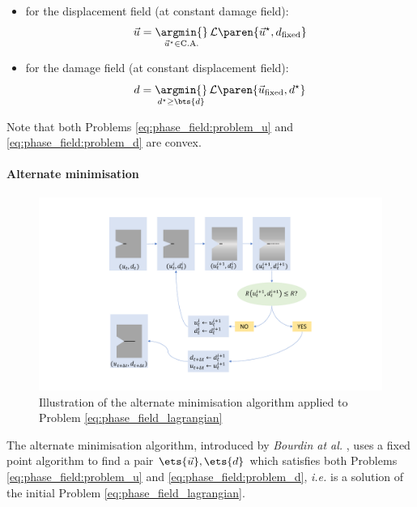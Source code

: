 \begin{itemize}
    \item for the displacement field (at constant damage field):
    \begin{equation}
        \label{eq:phase_field:problem_u}
        \vec{u} = \underset{\vec{u}^{\star}\in\text{C.A.}}{\argmin{}}\, \mathcal{L}\paren{\vec{u}^{\star},d_\mathrm{fixed}}
    \end{equation}
    \item for the damage field (at constant displacement field):
    \begin{equation}
        \label{eq:phase_field:problem_d}
        d = \underset{d^{\star}\geq\bts{d}}{\argmin{}}\, \mathcal{L}\paren{\vec{u}_\mathrm{fixed},d^{\star}}
    \end{equation}
\end{itemize}

Note that both Problems \eqref{eq:phase_field:problem_u} and
\eqref{eq:phase_field:problem_d} are convex.

\paragraph{Alternate minimisation}

\begin{figure}[H]
  \centering
  \includegraphics[width=10.cm]{../chapter_00_introduction/figures/alternate-minimisation-resolution.pdf}
  \caption{Illustration of the alternate minimisation algorithm applied to Problem \eqref{eq:phase_field_lagrangian}}
  \label{fig:hho:phase_field:alternate_minimisation}
\end{figure}


The alternate minimisation algorithm, introduced by \textit{Bourdin at al.}
\cite{bourdin_numerical_2000}, uses a fixed point algorithm to find a pair
\(\ets{\vec{u}},\ets{d}\) which satisfies both Problems
\eqref{eq:phase_field:problem_u} and \eqref{eq:phase_field:problem_d}, \textit{i.e.} is a
solution of the initial Problem \eqref{eq:phase_field_lagrangian}.

